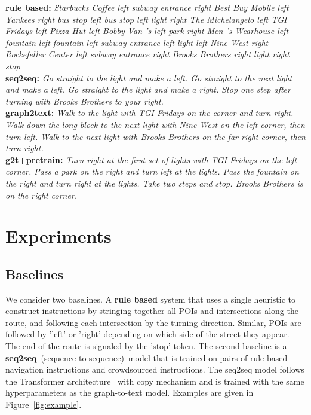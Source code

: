 \documentclass[11pt,a4paper]{article}
\begin{document}
\begin{figure*}[ht]
    \textbf{rule based:} \textit{Starbucks Coffee left subway entrance right Best Buy Mobile left Yankees right bus stop left bus stop left light right The Michelangelo left TGI Fridays left Pizza Hut left Bobby Van 's left park right Men 's Wearhouse left fountain left fountain left subway entrance left light left Nine West right Rockefeller Center left subway entrance right Brooks Brothers right light right stop} \\
    \textbf{seq2seq:} \textit{Go straight to the light and make a left. Go straight to the next light and make a left. Go straight to the light and make a right. Stop one step after turning with Brooks Brothers to your right.} \\
    \textbf{graph2text:} \textit{Walk to the light with TGI Fridays on the corner and turn right. Walk down the long block to the next light with Nine West on the left corner, then turn left. Walk to the next light with Brooks Brothers on the far right corner, then turn right.} \\
    \textbf{g2t+pretrain:} \textit{Turn right at the first set of lights with TGI Fridays on the left corner. Pass a park on the right and turn left at the lights. Pass the fountain on the right and turn right at the lights. Take two steps and stop. Brooks Brothers is on the right corner.}
    \caption{Route from partially seen test set paired with instructions generated by different systems.}
    \label{fig:example}
\end{figure*}
\section{Experiments}

\subsection{Baselines}
We consider two baselines. A \textbf{rule based} system that uses a single heuristic to construct instructions by stringing together all POIs and intersections along the route, and following each intersection by the turning direction. Similar, POIs are followed by 'left' or 'right' depending on which side of the street they appear. The end of the route is signaled by the 'stop' token.  The second baseline is a \textbf{seq2seq}~(sequence-to-sequence)~model that is trained on pairs of rule based navigation instructions and crowdsourced instructions. The seq2seq model follows the Transformer architecture~\citep{vaswani-etal-2017-attention} with copy mechanism and is trained with the same hyperparameters as the graph-to-text model. Examples are given in Figure~\ref{fig:example}.
\end{document}
